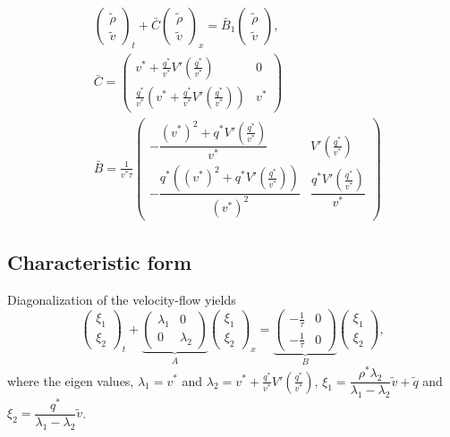 \documentclass[a4paper, 10pt, conference]{ieeeconf}      %
\begin{document}
\begin{subequations}
\begin{align}
&\begin{pmatrix}
	\tilde{\rho} \\
	\tilde{v}
\end{pmatrix}_t
+ \bar{C}
\begin{pmatrix}
	\tilde{\rho} \\ 
	\tilde{v}
\end{pmatrix}_x 
= 
\bar{B}_1
\begin{pmatrix}
	\tilde{\rho} \\
	\tilde{v}
\end{pmatrix}, \\
&\bar{C} 
=
\begin{pmatrix}
	v^* + \frac{q^*}{v^*} V'\left(\frac{q^*}{v^*}\right) & 0 \\
	\frac{q^*}{v^*} \left( v^* + \frac{q^*}{v^*} V'\left(\frac{q^*}{v^*}\right)\right) & v^*
\end{pmatrix} \\
&\bar{B} 
=
\frac{1}{v^{*}\tau}
\begin{pmatrix}
		-\dfrac{(v^*)^2+q^*V'\left(\frac{q^*}{v^*}\right)}{v^*} & V'\left(\frac{q^*}{v^*}\right) \\
		-\dfrac{q^*\left((v^*)^2 + q^*V'\left(\frac{q^*}{v^*}\right)\right)}{(v^*)^2}  & \dfrac{q^*V'\left(\frac{q^*}{v^*}\right)}{v^*}
\end{pmatrix}
\end{align}
\end{subequations}



\subsection{Characteristic form}

Diagonalization of the velocity-flow yields
\begin{equation} \label{vqlindiag}
\begin{pmatrix}
\xi_1 \\ \xi_2
\end{pmatrix}_t + 
\underset{A}{
	\underbrace{
	\begin{pmatrix}
		\lambda_1 & 0 \\
		0 & \lambda_2
	\end{pmatrix} 
	}
}
\begin{pmatrix}
\xi_1 \\ \xi_2
\end{pmatrix}_x = 
\underset{B}{
	\underbrace{
	\begin{pmatrix}
		-\frac{1}{\tau} & 0 \\
		-\frac{1}{\tau} & 0
	\end{pmatrix}}
}
\begin{pmatrix}
\xi_1 \\ \xi_2
\end{pmatrix},
\end{equation}
where the eigen values, $\lambda_1 = v^{*}$ and $\lambda_2 = v^{*} + \frac{q^{*}}{v^{*}} V'(\frac{q^{*}}{v^{*}})$, $\xi_1 = \dfrac{\rho^*\lambda_2}{\lambda_1 - \lambda_2}\tilde{v} + \tilde{q}$ and $\xi_2 = \dfrac{q^*}{\lambda_1 - \lambda_2}\tilde{v}$.
\end{document}
